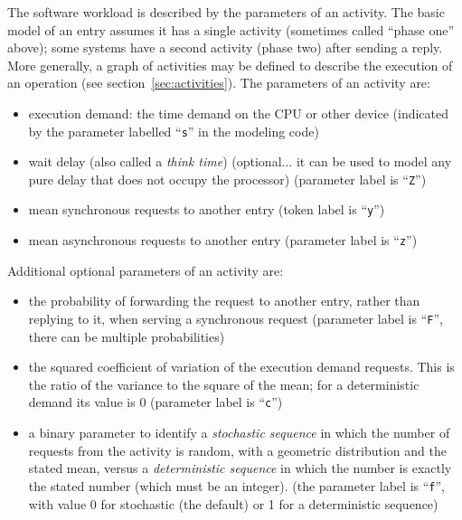 \documentclass[11pt]{article}
\makeatletter
\newcommand{\parameter}[1]{\texttt{#1}\index{#1@\texttt{#1}}}
\makeatother
\begin{document}
The software workload is described by the parameters of an activity. The basic model of an
entry assumes it has a single activity (sometimes called ``phase one'' above); some systems have a
second activity (phase two) after sending a reply. More generally, a graph of activities may be defined
to describe the execution of an operation (see section~\ref{sec:activities}). The parameters of an activity are:
\begin{itemize}
\item execution demand: the time demand on the CPU or other device (indicated by the parameter
labelled ``\parameter{s}'' in the modeling code)
\item wait delay (also called a \emph{think time}) (optional... it can be used to model any pure delay that does
not occupy the processor) (parameter label is ``\parameter{Z}'')
\item mean synchronous requests to another entry (token label is ``\parameter{y}'')
\item mean asynchronous requests to another entry (parameter label is ``\parameter{z}'')
\end{itemize}
Additional optional parameters of an activity are:
\begin{itemize}
\item the probability of forwarding the request to another entry, rather than replying to it, when serving
a synchronous request (parameter label is ``\parameter{F}'', there can be multiple probabilities)
\item the squared coefficient of variation of the execution demand requests. This is the ratio of the
variance to the square of the mean; for a deterministic  demand its value is 0 (parameter label is ``\parameter{c}'')
\item a binary parameter to identify a \emph{stochastic sequence} in which the number of requests from the
activity is random, with a geometric distribution and the stated mean, versus a \emph{deterministic
sequence} in which the number is exactly the stated number (which must be an integer). (the
parameter label is ``\parameter{f}'', with value 0 for stochastic (the default) or 1 for a deterministic sequence)
\end{itemize}
\end{document}
